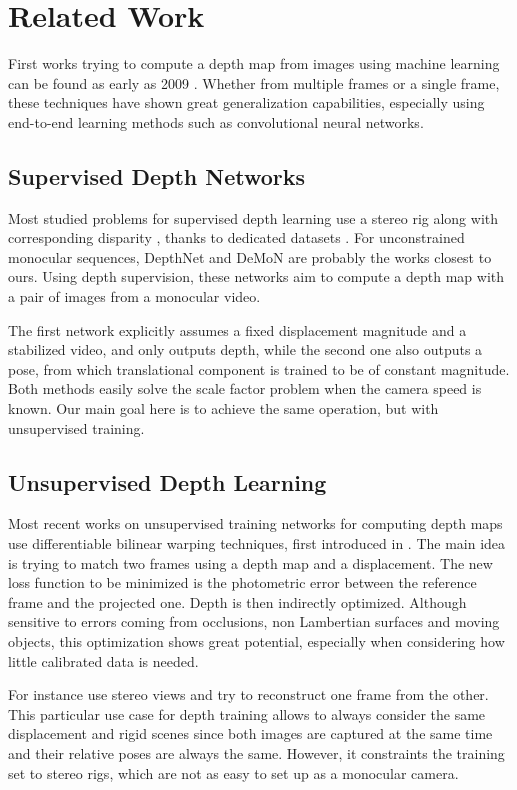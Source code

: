 \documentclass[runningheads]{llncs}
\begin{document}
\section{Related Work}

First works trying to compute a depth map from images using machine learning can be found as early as 2009 \cite{4531745}. Whether from multiple frames or a single frame, these techniques have shown great generalization capabilities, especially using end-to-end learning methods such as convolutional neural networks.

\subsection{Supervised Depth Networks}
Most studied problems for supervised depth learning use a stereo rig along with corresponding disparity \cite{zbontar2016stereo, Kendall2017EndtoEndLO}, thanks to dedicated datasets \cite{geiger2013vision, MIFDB16}. For unconstrained monocular sequences, DepthNet and DeMoN \cite{isprs-annals-IV-2-W3-67-2017,UZUMIDB17} are probably the works closest to ours.
Using depth supervision, these networks aim to compute a depth map with a pair of images from a monocular video.

The first network explicitly assumes a fixed displacement magnitude and a stabilized video, and only outputs depth, while the second one also outputs a pose, from which translational component is trained to be of constant magnitude.
Both methods easily solve the scale factor problem when the camera speed is known. Our main goal here is to achieve the same operation, but with unsupervised training.


\subsection{Unsupervised Depth Learning}
Most recent works on unsupervised training networks for computing depth maps use differentiable bilinear warping techniques, first introduced in \cite{jaderberg2015spatial}. The main idea is trying to match two frames using a depth map and a displacement. The new loss function to be minimized is the photometric error between the reference frame and the projected one. Depth is then indirectly optimized. Although sensitive to errors coming from occlusions, non Lambertian surfaces and moving objects, this optimization shows great potential, especially when considering how little calibrated data is needed.

For instance \cite{monodepth17, garg2016unsupervised, xie2016deep3d} use stereo views and try to reconstruct one frame from the other. This particular use case for depth training allows to always consider the same displacement and rigid scenes since both images are captured at the same time and their relative poses are always the same. However, it constraints the training set to stereo rigs, which are not as easy to set up as a monocular camera.
\end{document}
